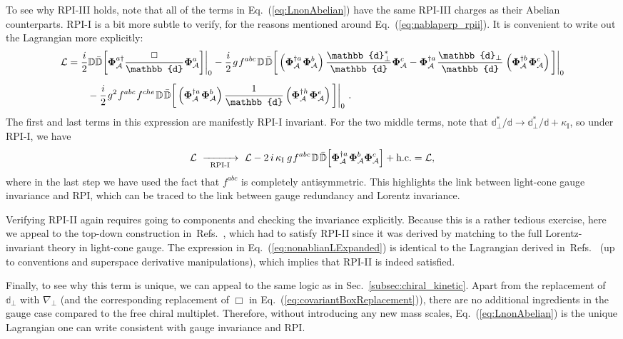 \documentclass[12pt,document,nofootinbib,superscriptaddress,onecolumn,preprintnumbers,balancelastpage]{article}
\newcommand{\rpii}{{\kappa_\text{I}}}
\newcommand{\s}{\hspace{0.8pt}}
\newcommand{\PP}{\mathbb{d}}
\newcommand{\RPIi}{\,\,\xrightarrow[\hspace{5pt}\text{RPI-I}\hspace{5pt}]{}\,\,}
\DeclareRobustCommand{\Sec}[1]{Sec.~\ref{#1}}
\DeclareRobustCommand{\Eq}[1]{Eq.~(\ref{#1})}
\DeclareRobustCommand{\Refs}[1]{Refs.~\cite{#1}}
\newcommand{\D}{\mathbb{D}}
\newcommand{\alc}{\mathcal{A}}
\newcommand{\bPhiA}{\bold \Phi_{\alc}}
\begin{document}
\begin{spacing}{1.2}
To see why RPI-III holds, note that all of the terms in \Eq{eq:LnonAbelian} have the same RPI-III charges as their Abelian counterparts.
%
RPI-I is a bit more subtle to verify, for the reasons mentioned around \Eq{eq:nablaperp_rpii}.
%
It is convenient to write out the Lagrangian more explicitly:  
%
\begin{align}
\label{eq:nonablianLExpanded}
\mathcal{L}
&= \frac{i}{2}\D \bar{\D} \bigg[ \bPhiA^{a \dagger} \frac{\Box}{\PP} \bPhiA^a  \bigg] \bigg|_0 - \frac{i}{2}\s g\s f^{abc}\s \D\s \bar{\D} \bigg[  \left(\bPhiA^{\dagger a}\s \bPhiA^b\right) \frac{\PP_\perp^*}{\PP} \bPhiA^c - \bPhiA^{\dagger a}\s \frac{\PP_\perp}{\PP}\s \left(\bPhiA^{\dagger b}\s \bPhiA^c  \right) \bigg] \bigg|_0 \notag \\[5pt] 
& \qquad - \frac{i}{2} \s g^2\s f^{abc}\s f^{che}\s \D \s \bar{\D} \bigg[  \left(\bPhiA^{\dagger a}\s \bPhiA^b\right) \frac{1}{\PP} \left( \bPhiA^{\dagger h}\s \bPhiA^e \right) \bigg] \bigg|_0  \,\,.
\end{align}
%
The first and last terms in this expression are manifestly RPI-I invariant.
%
For the two middle terms, note that $\PP^*_\perp / \PP \to \PP^*_\perp / \PP + \rpii$, so under RPI-I, we have 
%
\begin{equation}
\label{eq:gauge_rpii_check}
\mathcal{L} \RPIi \mathcal{L}  - 2 \, i \, \rpii  \, \s g\s f^{abc}\s \D\s \bar{\D} \Big[ \bPhiA^{\dagger a}\s \bPhiA^b \bPhiA^c \Big]  + \text{h.c.} = \mathcal{L},
\end{equation}
%
where in the last step we have used the fact that $f^{abc}$ is completely antisymmetric.
%
This highlights the link between light-cone gauge invariance and RPI, which can be traced to the link between gauge redundancy and Lorentz invariance. 


Verifying RPI-II again requires going to components and checking the invariance explicitly.
%
Because this is a rather tedious exercise, here we appeal to the top-down construction in~\Refs{Cohen:2016jzp,Cohen:2016dcl}, which had to satisfy RPI-II since it was derived by matching to  the full Lorentz-invariant theory in light-cone gauge.
%
The expression in \Eq{eq:nonablianLExpanded} is identical to the Lagrangian derived in~\Refs{Cohen:2016jzp,Cohen:2016dcl} (up to conventions and superspace derivative manipulations), which implies that RPI-II is indeed satisfied.
%

%
Finally, to see why this term is unique, we can appeal to the same logic as in \Sec{subsec:chiral_kinetic}.
%
Apart from the replacement of $\PP_\perp$ with $\nabla_\perp$ (and the corresponding replacement of $\Box$ in \Eq{eq:covariantBoxReplacement}), there are no additional ingredients in the gauge case compared to the free chiral multiplet.
%
Therefore, without introducing any new mass scales, \Eq{eq:LnonAbelian} is the unique Lagrangian one can write consistent with gauge invariance and RPI.



\end{spacing}
\end{document}
